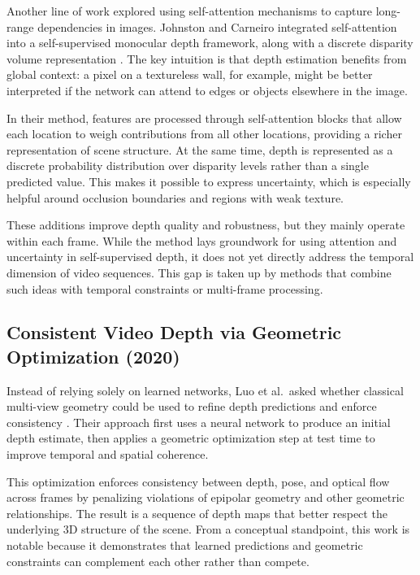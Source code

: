 \documentclass[10pt,twocolumn,letterpaper]{article}
\begin{document}
Another line of work explored using self-attention mechanisms to capture long-range dependencies in images. Johnston and Carneiro integrated self-attention into a self-supervised monocular depth framework, along with a discrete disparity volume representation \cite{johnston2020self}. The key intuition is that depth estimation benefits from global context: a pixel on a textureless wall, for example, might be better interpreted if the network can attend to edges or objects elsewhere in the image.

In their method, features are processed through self-attention blocks that allow each location to weigh contributions from all other locations, providing a richer representation of scene structure. At the same time, depth is represented as a discrete probability distribution over disparity levels rather than a single predicted value. This makes it possible to express uncertainty, which is especially helpful around occlusion boundaries and regions with weak texture.

These additions improve depth quality and robustness, but they mainly operate within each frame. While the method lays groundwork for using attention and uncertainty in self-supervised depth, it does not yet directly address the temporal dimension of video sequences. This gap is taken up by methods that combine such ideas with temporal constraints or multi-frame processing.

\subsection{Consistent Video Depth via Geometric Optimization (2020)}

Instead of relying solely on learned networks, Luo et al.\ asked whether classical multi-view geometry could be used to refine depth predictions and enforce consistency \cite{luo2020consistent}. Their approach first uses a neural network to produce an initial depth estimate, then applies a geometric optimization step at test time to improve temporal and spatial coherence.

This optimization enforces consistency between depth, pose, and optical flow across frames by penalizing violations of epipolar geometry and other geometric relationships. The result is a sequence of depth maps that better respect the underlying 3D structure of the scene. From a conceptual standpoint, this work is notable because it demonstrates that learned predictions and geometric constraints can complement each other rather than compete.
\end{document}
